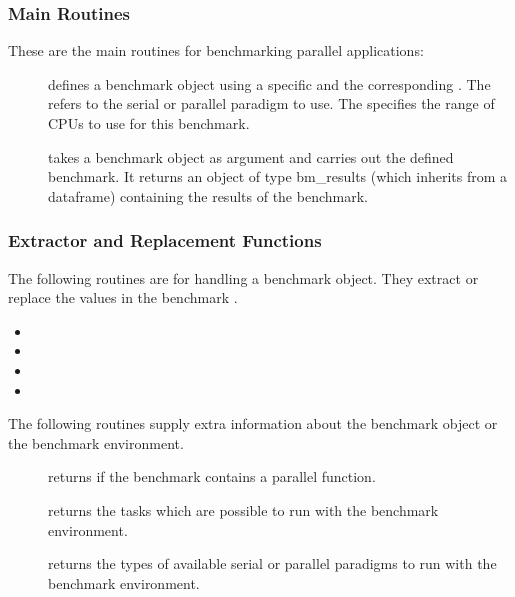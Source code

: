 \subsubsection{Main Routines}

These are the main routines for benchmarking parallel applications:

\begin{description}
\item[]
  defines a benchmark object using a specific  and the
  corresponding . The  refers to the serial or
  parallel paradigm to use. The  specifies the range
  of CPUs to use for this benchmark. 
\item[] takes a benchmark object as argument
  and carries out the defined benchmark. It returns an object of type
  bm\_results (which inherits from a dataframe) containing the
  results of the benchmark.
\end{description}


\subsubsection{Extractor and Replacement Functions}

The following routines are for handling a benchmark object. They
extract or replace the values in the benchmark .

\begin{itemize}
\item {}
\item {}
\item {}
\item {}
\end{itemize}

The following routines supply extra information about the benchmark object
or the benchmark environment.

\begin{description}
\item[] returns  if the benchmark
  contains a parallel function. 
\item[] returns the tasks which are possible to run
  with the benchmark environment.
\item[] returns the types of available serial or
  parallel paradigms to run with the benchmark environment.
\end{description}

